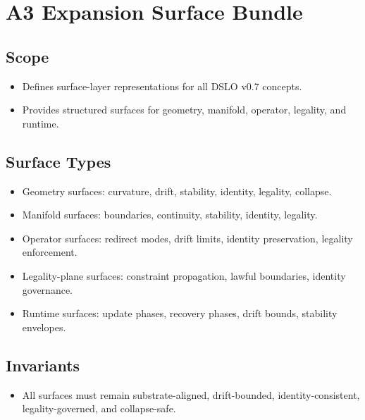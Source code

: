 \section{A3 Expansion Surface Bundle}

\subsection{Scope}
\begin{itemize}
    \item Defines surface-layer representations for all DSLO v0.7 concepts.
    \item Provides structured surfaces for geometry, manifold, operator, legality, and runtime.
\end{itemize}

\subsection{Surface Types}
\begin{itemize}
    \item Geometry surfaces: curvature, drift, stability, identity, legality, collapse.
    \item Manifold surfaces: boundaries, continuity, stability, identity, legality.
    \item Operator surfaces: redirect modes, drift limits, identity preservation, legality enforcement.
    \item Legality-plane surfaces: constraint propagation, lawful boundaries, identity governance.
    \item Runtime surfaces: update phases, recovery phases, drift bounds, stability envelopes.
\end{itemize}

\subsection{Invariants}
\begin{itemize}
    \item All surfaces must remain substrate-aligned, drift-bounded, identity-consistent, legality-governed, and collapse-safe.
\end{itemize}

